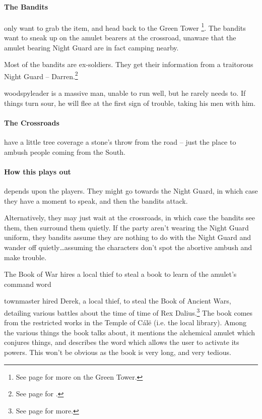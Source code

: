 \begin{multicols}{2}

\paragraph{The Bandits} only want to grab the item, and head back to the Green Tower \footnote{See page \pageref{green_tower} for more on the Green Tower.}.
The bandits want to sneak up on the amulet bearers at the crossroad, unaware that the amulet bearing Night Guard are in fact camping nearby.

Most of the bandits are ex-soldiers.
They get their information from a traitorous Night Guard -- Darren.\footnote{See page \pageref{traitor} for .}


\woodspyleader

\Gls{woodspyleader} is a massive man, unable to run well, but he rarely needs to.
If things turn sour, he will flee at the first sign of trouble, taking his men with him.

\paragraph{The Crossroads} have a little tree coverage a stone's throw from the road -- just the place to ambush people coming from the South.

\paragraph{How this plays out} depends upon the players.
They might go towards the Night Guard, in which case they have a moment to speak, and then the bandits attack.

Alternatively, they may just wait at the crossroads, in which case the bandits see them, then surround them quietly.
If the party aren't wearing the Night Guard uniform, they bandits assume they are nothing to do with the Night Guard and wander off quietly\ldots assuming the characters don't spot the abortive ambush and make trouble.

{The Book of War}%
{ hires a local thief to steal a book to learn of the amulet's command word}%

\Gls{townmaster} hired Derek, a local thief, to steal the Book of Ancient Wars, detailing various battles about the time of time of Rex Dalius.\footnote{See page \pageref{h_dalius} for more.}
The book comes from the restricted works in the Temple of C\'{a}l\"{e} (i.e. the local library).
Among the various things the book talks about, it mentions the alchemical amulet which conjures things, and describes the word which allows the user to activate its powers.
This won't be obvious as the book is very long, and very tedious.


\end{multicols}
